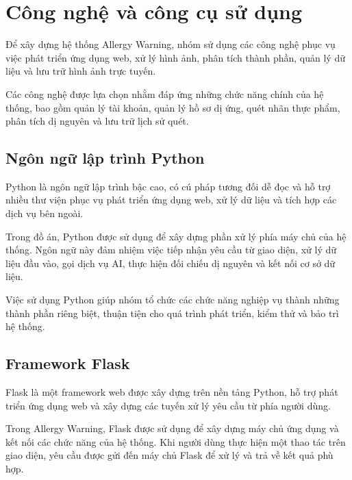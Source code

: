 	
	\section{Công nghệ và công cụ sử dụng}
	
	Để xây dựng hệ thống Allergy Warning, nhóm sử dụng các công nghệ
	phục vụ việc phát triển ứng dụng web, xử lý hình ảnh, phân tích
	thành phần, quản lý dữ liệu và lưu trữ hình ảnh trực tuyến.
	
	Các công nghệ được lựa chọn nhằm đáp ứng những chức năng chính
	của hệ thống, bao gồm quản lý tài khoản, quản lý hồ sơ dị ứng,
	quét nhãn thực phẩm, phân tích dị nguyên và lưu trữ lịch sử quét.
	
	\subsection{Ngôn ngữ lập trình Python}
	
	Python là ngôn ngữ lập trình bậc cao, có cú pháp tương đối dễ đọc
	và hỗ trợ nhiều thư viện phục vụ phát triển ứng dụng web, xử lý
	dữ liệu và tích hợp các dịch vụ bên ngoài.
	
	Trong đồ án, Python được sử dụng để xây dựng phần xử lý phía máy
	chủ của hệ thống. Ngôn ngữ này đảm nhiệm việc tiếp nhận yêu cầu
	từ giao diện, xử lý dữ liệu đầu vào, gọi dịch vụ AI, thực hiện
	đối chiếu dị nguyên và kết nối cơ sở dữ liệu.
	
	Việc sử dụng Python giúp nhóm tổ chức các chức năng nghiệp vụ
	thành những thành phần riêng biệt, thuận tiện cho quá trình
	phát triển, kiểm thử và bảo trì hệ thống.
	
	\subsection{Framework Flask}
	
	Flask là một framework web được xây dựng trên nền tảng Python,
	hỗ trợ phát triển ứng dụng web và xây dựng các tuyến xử lý
	yêu cầu từ phía người dùng.
	
	Trong Allergy Warning, Flask được sử dụng để xây dựng máy chủ
	ứng dụng và kết nối các chức năng của hệ thống. Khi người dùng
	thực hiện một thao tác trên giao diện, yêu cầu được gửi đến
	máy chủ Flask để xử lý và trả về kết quả phù hợp.
	
